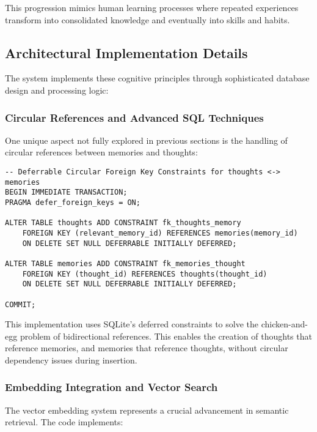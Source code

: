 \documentclass[12pt,a4paper]{article}
\begin{document}
This progression mimics human learning processes where repeated experiences transform into consolidated knowledge and eventually into skills and habits.

\subsection*{Architectural Implementation Details}

The system implements these cognitive principles through sophisticated database design and processing logic:

\subsubsection*{Circular References and Advanced SQL Techniques}

One unique aspect not fully explored in previous sections is the handling of circular references between memories and thoughts:
\begin{pageablecode}
\begin{verbatim}
-- Deferrable Circular Foreign Key Constraints for thoughts <-> memories
BEGIN IMMEDIATE TRANSACTION;
PRAGMA defer_foreign_keys = ON;

ALTER TABLE thoughts ADD CONSTRAINT fk_thoughts_memory
    FOREIGN KEY (relevant_memory_id) REFERENCES memories(memory_id)
    ON DELETE SET NULL DEFERRABLE INITIALLY DEFERRED;

ALTER TABLE memories ADD CONSTRAINT fk_memories_thought
    FOREIGN KEY (thought_id) REFERENCES thoughts(thought_id)
    ON DELETE SET NULL DEFERRABLE INITIALLY DEFERRED;

COMMIT;
\end{verbatim}
\end{pageablecode}
This implementation uses SQLite's deferred constraints to solve the chicken-and-egg problem of bidirectional references. This enables the creation of thoughts that reference memories, and memories that reference thoughts, without circular dependency issues during insertion.

\subsubsection*{Embedding Integration and Vector Search}

The vector embedding system represents a crucial advancement in semantic retrieval. The code implements:
\end{document}
